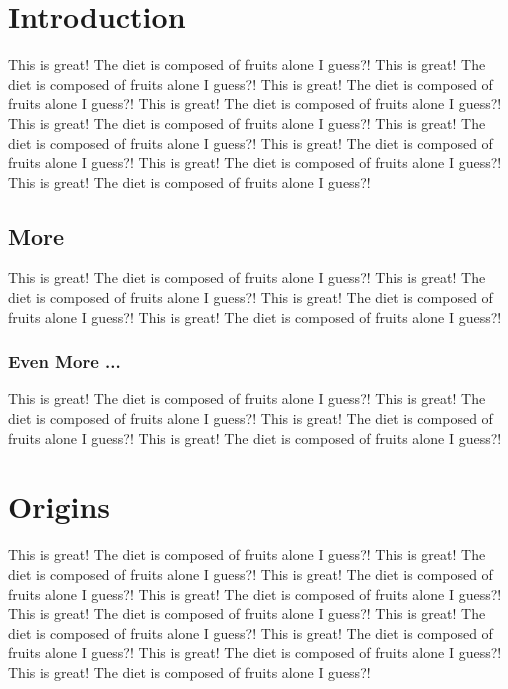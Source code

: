 \section{Introduction}

This is great! The diet is composed of fruits alone I guess?! This is great! The diet is composed of fruits alone I guess?! This is great! The diet is composed of fruits alone I guess?! This is great! The diet is composed of fruits alone I guess?! This is great! The diet is composed of fruits alone I guess?! This is great! The diet is composed of fruits alone I guess?! This is great! The diet is composed of fruits alone I guess?! This is great! The diet is composed of fruits alone I guess?! This is great! The diet is composed of fruits alone I guess?! 

\subsection{More}

This is great! The diet is composed of fruits alone I guess?! This is great! The diet is composed of fruits alone I guess?! This is great! The diet is composed of fruits alone I guess?! This is great! The diet is composed of fruits alone I guess?! 

\subsubsection{Even More ...}

This is great! The diet is composed of fruits alone I guess?! This is great! The diet is composed of fruits alone I guess?! This is great! The diet is composed of fruits alone I guess?! This is great! The diet is composed of fruits alone I guess?! 

\section{Origins}

This is great! The diet is composed of fruits alone I guess?! This is great! The diet is composed of fruits alone I guess?! This is great! The diet is composed of fruits alone I guess?! This is great! The diet is composed of fruits alone I guess?! This is great! The diet is composed of fruits alone I guess?! This is great! The diet is composed of fruits alone I guess?! This is great! The diet is composed of fruits alone I guess?! This is great! The diet is composed of fruits alone I guess?! This is great! The diet is composed of fruits alone I guess?! 


